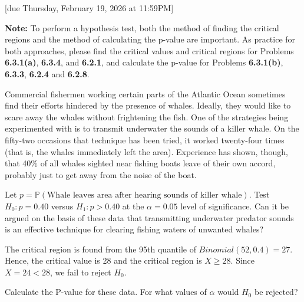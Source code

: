 \documentclass{article}
\renewcommand{\P}{\mathbb{P}}
\begin{document}
[due Thursday, February 19, 2026 at 11:59PM]

\textbf{Note:} To perform a hypothesis test, both the method of finding the critical regions and the method of calculating the p-value are important. As practice for both approaches, please find the critical values and critical regions for Problems \textbf{6.3.1(a)}, \textbf{6.3.4}, and \textbf{6.2.1}, and calculate the p-value for Problems \textbf{6.3.1(b)}, \textbf{6.3.3}, \textbf{6.2.4} and \textbf{6.2.8}.

\vspace{1em}

\begin{probset}
\begin{prob}[\textbf{6.3.1}]
    Commercial fishermen working certain parts of the Atlantic Ocean sometimes find their efforts hindered by
    the presence of whales. Ideally, they would like to scare away the whales without frightening the fish. One of the strategies being experimented with is to transmit underwater the sounds of a killer whale. On the fifty-two occasions that technique has been tried, it worked twenty-four times (that is, the whales immediately left the area). Experience has shown, though, that 40\% of all whales sighted near fishing boats leave of their own accord, probably just to get away from the noise of the boat.

    \begin{subprobset}
    \begin{subprob}
        Let $p = \P(\text{Whale leaves area after hearing sounds of killer whale})$. Test $H_0: p = 0.40$ versus $H_1: p > 0.40$ at the $\alpha = 0.05$ level of significance. Can it be argued on the basis of these data that transmitting underwater predator sounds is an effective technique for clearing fishing waters of unwanted whales?

        \begin{soln}
            The critical region is found from the 95th quantile of $Binomial(52, 0.4) = 27$. Hence, the critical value is 28 and the critical region is $X \geq 28$. Since $X = 24 < 28$, we fail to reject $H_0$.
        \end{soln}
    \end{subprob}

    \begin{subprob}
        Calculate the P-value for these data. For what values of $\alpha$ would $H_0$ be rejected?


\end{subprob}
\end{subprobset}
\end{prob}
\end{probset}
\end{document}
